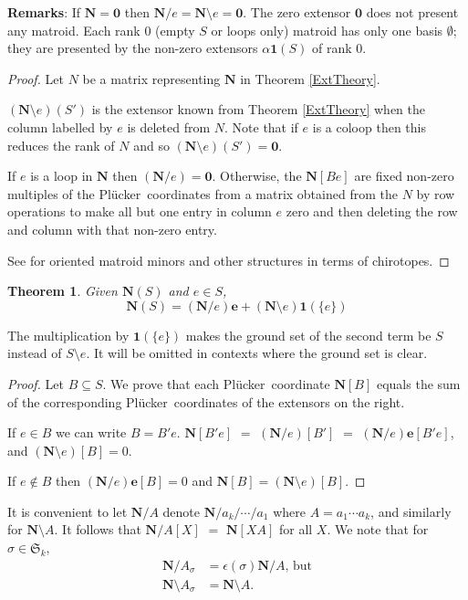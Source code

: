\documentclass[12pt]{article}
\newtheorem{theorem}{Theorem}[section]
\theoremstyle{definition}
\newcommand{\Remarks}{\textbf{Remarks}}
\newcommand{\Perms}{\ensuremath{\mathfrak{S}}}
\newcommand{\ext}[1]{\ensuremath{\mathbf{#1}}}
\newcommand{\Plucker}{Pl\"{u}cker\ }
\begin{document}
\Remarks: 
If $\ext{N}=\ext{0}$ then $\ext{N}/e=\ext{N}\setminus e=\ext{0}$.
The zero extensor $\ext{0}$ does not present any matroid.  Each rank 0
(empty $S$ or loops only) matroid 
has only one basis $\emptyset$; they are presented by the non-zero
extensors $\alpha\ext{1}(S)$ of rank $0$.  

\begin{proof}
Let $N$ be a matrix representing $\ext{N}$ in Theorem \ref{ExtTheory}.

$(\ext{N}\setminus e)(S')$ is the extensor known from Theorem \ref{ExtTheory}
when the column labelled by $e$ is deleted from $N$.  Note that 
if $e$ is a coloop then
this reduces the rank of $N$ and so $(\ext{N}\setminus e)(S')=\ext{0}$.  

If $e$ is a loop in $\ext{N}$ then $(\ext{N}/e)=\ext{0}$.  Otherwise, 
the $\ext{N}[Be]$ are fixed non-zero multiples 
of the \Plucker coordinates from a 
matrix obtained from the $N$ by row operations to make all
but one entry in column $e$ zero and then deleting the row and column
with that non-zero entry.

See \cite[]{OMBOOK} for oriented matroid minors and other
structures in terms of chirotopes.
\end{proof}


\begin{theorem}
\label{ExtDC}
Given $\ext{N}(S)$ and $e\in S$,
\[
\ext{N}(S) = (\ext{N}/e)\ext{e} + (\ext{N}\setminus e)\ext{1}(\{e\})
\]
\end{theorem}
The multiplication by $\ext{1}(\{e\})$ makes the ground set of the 
second term be $S$ instead of $S\setminus e$.  It will be omitted in
contexts where the ground set is clear.

\begin{proof}
Let $B\subseteq S$.
We prove that each \Plucker coordinate $\ext{N}[B]$ equals the sum of the 
corresponding \Plucker coordinates of the extensors on the right.


If $e\in B$ we can write $B=B'e$.
$\ext{N}[B'e]$ $=$ $(\ext{N}/e)[B']$ 
$=$ $(\ext{N}/e)\ext{e}[B'e]$, and $(\ext{N}\setminus e)[B]=0$.

If $e\not\in B$ then $(\ext{N}/e)\ext{e}[B]=0$
and $\ext{N}[B]=(\ext{N}\setminus e)[B]$.
\end{proof}

It is convenient to let $\ext{N}/A$ denote 
$\ext{N}/a_k/\cdots/a_1$ where $A=a_1\cdots a_k$, and similarly for
$\ext{N}\setminus A$.  It follows that $\ext{N}/A[X]$
$=$ $\ext{N}[XA]$ for all $X$.  We note that for $\sigma\in\Perms_k$,
\begin{equation}
\label{PermuteContraction}
\begin{split}
\ext{N}/A_\sigma &= \epsilon(\sigma)\ext{N}/A\text{, but}\\
\ext{N}\setminus A_\sigma &= \ext{N}\setminus A.
\end{split}
\end{equation}
\end{document}
